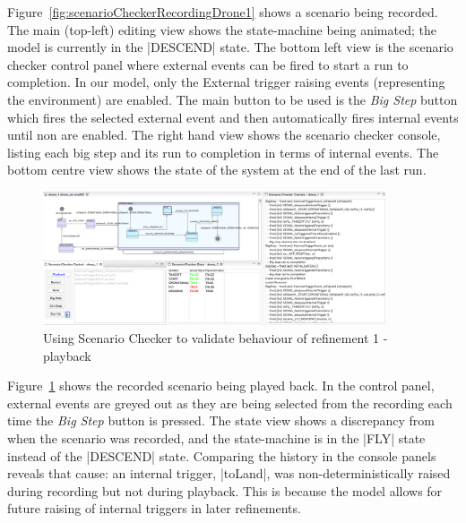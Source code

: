 Figure~\ref{fig:scenarioCheckerRecordingDrone1} shows a scenario being recorded.
The main (top-left) editing view shows the state-machine being animated; the model is currently in the |DESCEND| state.
The bottom left view is the scenario checker control panel where external events can be fired to start a run to completion.
In our model, only the External trigger raising events (representing the environment) are enabled.
The main button to be used is the \emph{Big Step} button which fires the selected external event and then automatically fires internal events until non are enabled.
The right hand view shows the scenario checker console, listing each big step and its run to completion in terms of internal events.
The bottom centre view shows the state of the system at the end of the last run.

\begin{figure}[!th]
	\centering
	\includegraphics[width=0.90\textwidth, trim=30 50 60 0]{figures/scenarioChecker_playback_drone1.png}
	\caption{Using Scenario Checker to validate behaviour of refinement 1 - playback }
	\label{fig:scenarioCheckerPlaybackDrone1}
\end{figure}

Figure~\ref{fig:scenarioCheckerPlaybackDrone1} shows the recorded scenario being played back.
In the control panel, external events are greyed out as they are being selected from the recording each time the \emph{Big Step} button is pressed. 
The state view shows a discrepancy from when the scenario was recorded, and the state-machine is in the |FLY| state instead of the |DESCEND| state.
Comparing the history in the console panels reveals that cause: an internal trigger, |toLand|, was non-deterministically raised during recording but not during playback.
This is because the model allows for future raising of internal triggers in later refinements.

